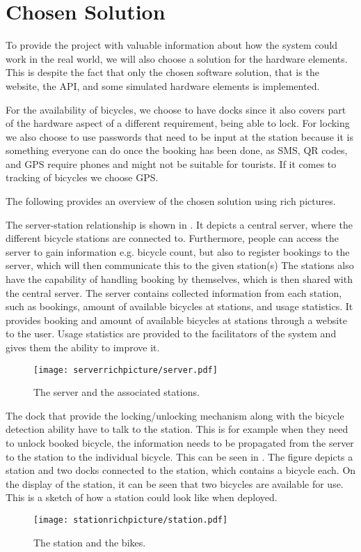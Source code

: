 \section{Chosen Solution}
To provide the project with valuable information about how the system could work in the real world, we will also choose a solution for the hardware elements.
This is despite the fact that only the chosen software solution, that is the website, the API, and some simulated hardware elements is implemented.

For the availability of bicycles, we choose to have docks since it also covers part of the hardware aspect of a different requirement, being able to lock.  
For locking we also choose to use passwords that need to be input at the station because it is something everyone can do once the booking has been done, as SMS, QR codes, and GPS require phones and might not be suitable for tourists.
If it comes to tracking of bicycles we choose GPS.

The following provides an overview of the chosen solution using rich pictures.

The server-station relationship is shown in .
It depicts a central server, where the different bicycle stations are connected to.
Furthermore, people can access the server to gain information e.g. bicycle count, but also to register bookings to the server, which will then communicate this to the given station(s)
The stations also have the capability of handling booking by themselves, which is then shared with the central server.
The server contains collected information from each station, such as bookings, amount of available bicycles at stations, and usage statistics.
It provides booking and amount of available bicycles at stations through a website to the user. 
Usage statistics are provided to the facilitators of the system and gives them the ability to improve it. 

\begin{figure}[h]
\centering
\texttt{[image: serverrichpicture/server.pdf]}
\caption{The server and the associated stations.}
\label{fig:ServerRichPicture}
\end{figure}

The dock that provide the locking/unlocking mechanism along with the bicycle detection ability have to talk to the station. 
This is for example when they need to unlock booked bicycle, the information needs to be propagated from the server to the station to the individual bicycle.
This can be seen in .
The figure depicts a station and two docks connected to the station, which contains a bicycle each. 
On the display of the station, it can be seen that two bicycles are available for use.
This is a sketch of how a station could look like when deployed.
\begin{figure}[h]
\centering
\texttt{[image: stationrichpicture/station.pdf]}
\caption{The station and the bikes.}
\label{fig:StationRichPicture}
\end{figure}